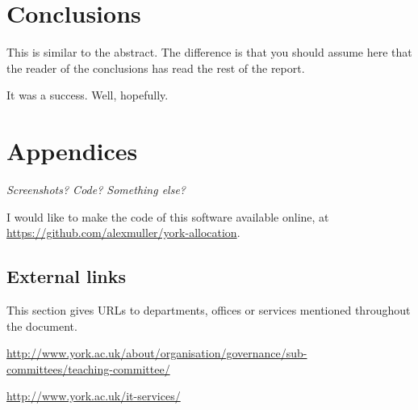 \documentclass[]{article}
\begin{document}
\section{Conclusions}

This is similar to the abstract. The difference is that you should assume here that the reader of the conclusions has read the rest of the report.

It was a success. Well, hopefully.

\section{Appendices}

\textit{Screenshots? Code? Something else?}

I would like to make the code of this software available online, at \url{https://github.com/alexmuller/york-allocation}.

\subsection{External links}

This section gives URLs to departments, offices or services mentioned throughout the document.

\url{http://www.york.ac.uk/about/organisation/governance/sub-committees/teaching-committee/}

\url{http://www.york.ac.uk/it-services/}


\newpage

\end{document}
